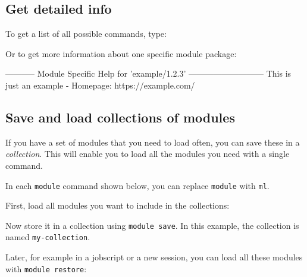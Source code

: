 \fi
\subsection{Get detailed info}

To get a list of all possible commands, type:

\begin{prompt}
\end{prompt}

Or to get more information about one specific module package:

\begin{prompt}
----------- Module Specific Help for 'example/1.2.3' ---------------------------
  This is just an example - Homepage: https://example.com/
\end{prompt}

\ifusinglmod
\subsection{Save and load collections of modules}
\label{sec:lmod-module-collection}

If you have a set of modules that you need to load often,
you can save these in a \emph{collection}. This will enable you to load all the
modules you need with a single command.

In each \lstinline|module| command shown below, you can replace \lstinline|module| with
\lstinline|ml|.

First, load all modules you want to include in the collections:

\begin{prompt}
\end{prompt}

Now store it in a collection using \lstinline|module save|. In this example, the collection
is named \lstinline|my-collection|.

\begin{prompt}
\end{prompt}

Later, for example in a jobscript or a new session, you can load all these modules with
\lstinline|module restore|:

\begin{prompt}
\end{prompt}

